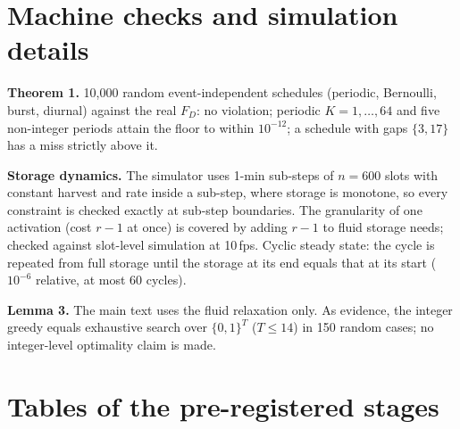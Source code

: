 \documentclass[10pt]{article}
\begin{document}
\section{Machine checks and simulation details}
\textbf{Theorem 1.} 10{,}000 random event-independent schedules (periodic, Bernoulli, burst, diurnal) against the real $F_D$: no violation; periodic $K=1,\dots,64$ and five non-integer periods attain the floor to within $10^{-12}$; a schedule with gaps $\{3,17\}$ has a miss strictly above it.

\textbf{Storage dynamics.} The simulator uses 1-min sub-steps of $n=600$ slots with constant harvest and rate inside a sub-step, where storage is monotone, so every constraint is checked exactly at sub-step boundaries. The granularity of one activation (cost $r-1$ at once) is covered by adding $r-1$ to fluid storage needs; checked against slot-level simulation at 10\,fps. Cyclic steady state: the cycle is repeated from full storage until the storage at its end equals that at its start ($10^{-6}$ relative, at most 60 cycles).

\textbf{Lemma 3.} The main text uses the fluid relaxation only. As evidence, the integer greedy equals exhaustive search over $\{0,1\}^T$ ($T\le14$) in 150 random cases; no integer-level optimality claim is made.

\section{Tables of the pre-registered stages}

\end{document}
